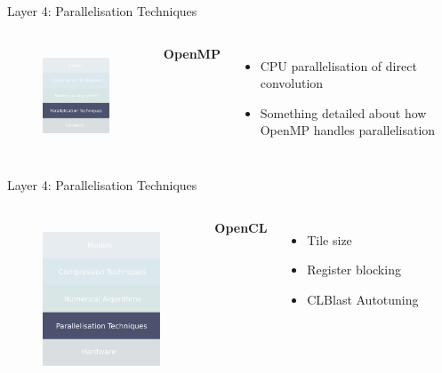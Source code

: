 \documentclass[xcolor=dvipsnames]{beamer}
\begin{document}
\begin{frame}{Layer 4: Parallelisation Techniques}

\begin{columns}


\begin{figure}
    \centering
    \includegraphics[width=3.5cm]{images/parallelisations.pdf}
    \label{fig:inference-stack-parallels}
\end{figure}


\textbf{OpenMP}
\begin{itemize}
    \item CPU parallelisation of direct convolution 
    \item Something detailed about how OpenMP handles parallelisation
\end{itemize}

\end{columns}

\end{frame}


\begin{frame}{Layer 4: Parallelisation Techniques}

\begin{columns}


\begin{figure}
    \centering
    \includegraphics[width=3.5cm]{images/parallelisations.pdf}
    \label{fig:inference-stack-parallels-2}
\end{figure}


\textbf{OpenCL}
\begin{itemize}
    \item Tile size
    \item Register blocking 
    \item CLBlast Autotuning 
\end{itemize}

\end{columns}

\end{frame}
\end{document}
